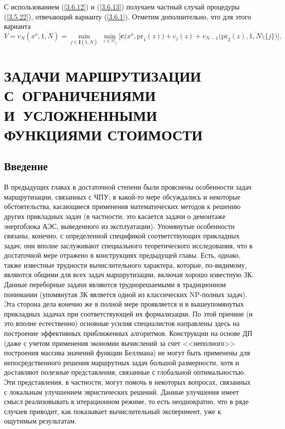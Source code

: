 \documentclass[11pt,twoside,openany]{report}
\newcommand{\ov}{\overline}
\newcommand{\sm}{\setminus}
\newcommand{\bbm}{{\mathbb M}}
\begin{document}
{С использованием (\ref{3.6.12}) и (\ref{3.6.13})
получаем частный случай процедуры (\ref{3.5.22}),
отвечающий варианту (\ref{3.6.1}).
Отметим дополнительно, что для этого варианта
$$
  V = v_N(x^o,\ov{1,N}) = \min\limits_{j\in \mathbf{I}(\ov{1,N})}\
  \min\limits_{z\in \bbm_j}\bigl[\mathbf{c}(x^o,\mathrm{pr}_1(z)\bigl) +
  c_j(z) + v_{N-1}\bigl(\mathrm{pr}_2(z),\ov{1,N}\sm\{j\}\bigl)\bigl]
  .
$$

\chapter{
  ЗАДАЧИ МАРШРУТИЗАЦИИ С~ОГРАНИЧЕНИЯМИ И~УСЛОЖНЕННЫМИ
  ФУНКЦИЯМИ СТОИМОСТИ
}
\setcounter{chapter}{4}
\setcounter{equation}{0}


\section{
  Введение
}
\label{sect:4.1}
\setcounter{equation}{0}

В предыдущих главах в достаточной степени были прояснены особенности задач
маршрутизации, связанных с ЧПУ; в какой-то мере обсуждались и некоторые
обстоятельства, касающиеся применения математических методов к решению других
прикладных задач (в частности, это касается задачи о демонтаже энергоблока
АЭС, выведенного из эксплуатации). Упомянутые особенности связаны, конечно,
с определенной спецификой соответствующих прикладных задач; они вполне
заслуживают специального теоретического исследования, что в достаточной
мере отражено в конструкциях предыдущей главы. Есть, однако, также
известные трудности вычислительного характера, которые, по-видимому,
являются общими для всех задач  маршрутизации, включая хорошо известную
ЗК. Данные переборные задачи являются труднорешаемыми в традиционном
понимании (упомянутая ЗК является одной из классических NP-полных задач).
Эта сторона дела конечно же в полной мере проявляется и в вышеупомянутых
прикладных задачах при соответствующей  их формализации. По этой причине
(и это вполне естественно) основные усилия специалистов направлены здесь
на построение эффективных приближенных алгоритмов. Конструкции на основе
ДП (даже с учетом применения экономии вычислений за счет <<неполного>>
построения массива значений функции Беллмана) не могут быть применены для
непосредственного решения маршрутных задач большой размерности, хотя и
доставляют полезные представления, связанные с глобальной оптимальностью.
Эти представления, в частности, могут помочь в некоторых вопросах,
связанных с локальным улучшением эвристических решений. Данные улучшения
имеет смысл реализовывать в итерационном режиме, то есть неоднократно,
что в ряде случаев приводит, как показывает вычислительный эксперимент,
уже к ощутимым результатам.

}
\end{document}
